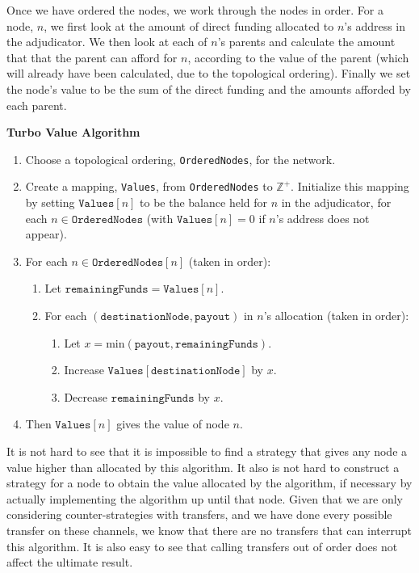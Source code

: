 Once we have ordered the nodes, we work through the nodes in order.
For a node, $n$, we first look at the amount of direct funding allocated to $n$'s address in the adjudicator.
We then look at each of $n$'s parents and calculate the amount that that the parent can afford for $n$, according to the value of the parent (which will already have been calculated, due to the topological ordering).
Finally we set the node's value to be the sum of the direct funding and the amounts afforded by each parent.

\textbf{Turbo Value Algorithm}
\begin{enumerate}
  \item Choose a topological ordering, \texttt{OrderedNodes}, for the network.
  \item Create a mapping, \texttt{Values}, from \texttt{OrderedNodes} to $\mathbb{Z}^+$. Initialize this mapping by setting $\texttt{Values}[n]$ to be the balance held for $n$ in the adjudicator, for each $n \in \texttt{OrderedNodes}$ (with $\texttt{Values}[n] = 0$ if $n$'s address does not appear).
  \item For each $n \in \texttt{OrderedNodes}[n]$ (taken in order):
  \begin{enumerate}
    \item Let $\texttt{remainingFunds} = \texttt{Values}[n]$.
    \item For each $(\texttt{destinationNode}, \texttt{payout})$ in $n$'s allocation (taken in order):
      \begin{enumerate}
        \item Let $x = \text{min}(\texttt{payout}, \texttt{remainingFunds})$.
        \item Increase $\texttt{Values}[\texttt{destinationNode}]$ by $x$.
        \item Decrease $\texttt{remainingFunds}$ by $x$.
      \end{enumerate}
  \end{enumerate}
  \item Then $\texttt{Values}[n]$ gives the value of node $n$.
\end{enumerate}




It is not hard to see that it is impossible to find a strategy that gives any node a value higher than allocated by this algorithm.
It also is not hard to construct a strategy for a node to obtain the value allocated by the algorithm, if necessary by actually implementing the algorithm up until that node.
Given that we are only considering counter-strategies with transfers, and we have done every possible transfer on these channels, we know that there are no transfers that can interrupt this algorithm.
It is also easy to see that calling transfers out of order does not affect the ultimate result.


